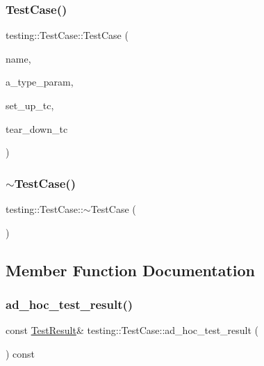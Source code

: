 \subsubsection{\texorpdfstring{Test\+Case()}{TestCase()}}
{\footnotesize\ttfamily testing\+::\+Test\+Case\+::\+Test\+Case (\begin{DoxyParamCaption}\item[{const char $\ast$}]{name,  }\item[{const char $\ast$}]{a\+\_\+type\+\_\+param,  }\item[{\hyperlink{classtesting_1_1_test_a5f2a051d1d99c9b784c666c586186cf9}{Test\+::\+Set\+Up\+Test\+Case\+Func}}]{set\+\_\+up\+\_\+tc,  }\item[{\hyperlink{classtesting_1_1_test_aa0f532e93b9f3500144c53f31466976c}{Test\+::\+Tear\+Down\+Test\+Case\+Func}}]{tear\+\_\+down\+\_\+tc }\end{DoxyParamCaption})}

\mbox{\label{classtesting_1_1_test_case_a96ab68dd1f8f64a7087ac34ff64a2e46}} 
\subsubsection{\texorpdfstring{$\sim$\+Test\+Case()}{~TestCase()}}
{\footnotesize\ttfamily testing\+::\+Test\+Case\+::$\sim$\+Test\+Case (\begin{DoxyParamCaption}{ }\end{DoxyParamCaption})\hspace{0.3cm}{\ttfamily [virtual]}}



\subsection{Member Function Documentation}
\mbox{\label{classtesting_1_1_test_case_a6d5fc5003bc3352f3ddae7dadc6d2364}} 
\subsubsection{\texorpdfstring{ad\+\_\+hoc\+\_\+test\+\_\+result()}{ad\_hoc\_test\_result()}}
{\footnotesize\ttfamily const \hyperlink{classtesting_1_1_test_result}{Test\+Result}\& testing\+::\+Test\+Case\+::ad\+\_\+hoc\+\_\+test\+\_\+result (\begin{DoxyParamCaption}{ }\end{DoxyParamCaption}) const\hspace{0.3cm}{\ttfamily [inline]}}

